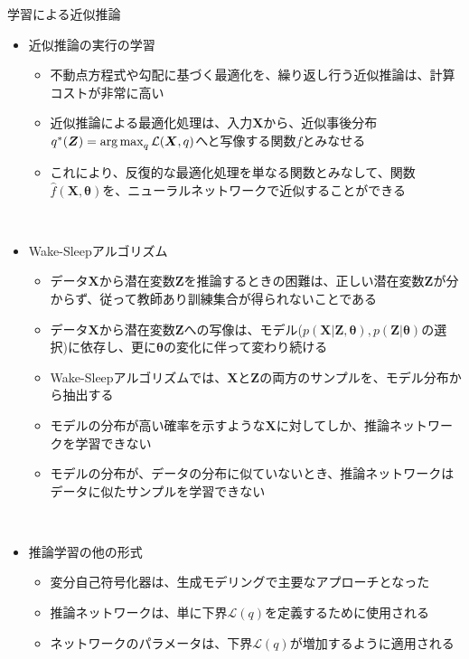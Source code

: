 \documentclass[dvipdfmx,notheorems,t]{beamer}
\begin{document}
\begin{frame}{学習による近似推論}

\begin{itemize}
	\item 近似推論の実行の学習
	\begin{itemize}
		\item 不動点方程式や勾配に基づく最適化を、繰り返し行う近似推論は、計算コストが非常に高い
		\newline
		\item 近似推論による最適化処理は、入力$\bm{X}$から、近似事後分布$q^*(\bm{Z}) = \operatorname*{arg\,max}_q \mathcal{L}(\bm{X}, q)$へと写像する関数$f$とみなせる
		\item これにより、反復的な最適化処理を単なる関数とみなして、関数$\widehat{f}(\bm{X}, \bm{\theta})$を、ニューラルネットワークで近似することができる
	\end{itemize} \
	
	\item Wake-Sleepアルゴリズム
	\begin{itemize}
		\item データ$\bm{X}$から潜在変数$\bm{Z}$を推論するときの困難は、正しい潜在変数$\bm{Z}$が分からず、従って\alert{教師あり訓練集合}が得られないことである
		\item データ$\bm{X}$から潜在変数$\bm{Z}$への写像は、モデル($p(\bm{X} | \bm{Z}, \bm{\theta}), p(\bm{Z} | \bm{\theta})$の選択)に依存し、更に$\bm{\theta}$の変化に伴って変わり続ける
		\newline
		
		\item Wake-Sleepアルゴリズムでは、$\bm{X}$と$\bm{Z}$の両方のサンプルを、モデル分布から抽出する
		\item モデルの分布が高い確率を示すような$\bm{X}$に対してしか、推論ネットワークを学習できない
		\newline
		\item モデルの分布が、データの分布に似ていないとき、推論ネットワークはデータに似たサンプルを学習できない
	\end{itemize} \
	
	\item 推論学習の他の形式
	\begin{itemize}
		\item \alert{変分自己符号化器}は、生成モデリングで主要なアプローチとなった
		\newline
		\item 推論ネットワークは、単に下界$\mathcal{L}(q)$を定義するために使用される
		\item ネットワークのパラメータは、下界$\mathcal{L}(q)$が増加するように適用される
	\end{itemize}
\end{itemize}

\end{frame}
\end{document}
